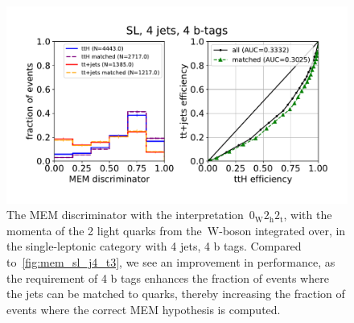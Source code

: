 \begin{figure}
\begin{centering}
\includegraphics[width = 1.0\textwidth]{figures/mem_sl_j4_t4.pdf}
\caption[The MEM discriminator with the~$0_{\mathrm{W}} 2_{\mathrm{h}} 2_{\mathrm{t}}$ interpretation in the 4~jet, 4~b-tag category]{The MEM discriminator with the interpretation~$0_{\mathrm{W}} 2_{\mathrm{h}} 2_{\mathrm{t}}$, with the momenta of the 2 light quarks from the~$\mathrm{W}$-boson integrated over, in the single-leptonic category with 4 jets, 4 b tags. Compared to~\cref{fig:mem_sl_j4_t3}, we see an improvement in performance, as the requirement of 4 b tags enhances the fraction of events where the jets can be matched to quarks, thereby increasing the fraction of events where the correct MEM hypothesis is computed.}
\label{fig:mem_sl_j4_t4}
\end{centering}
\end{figure}

